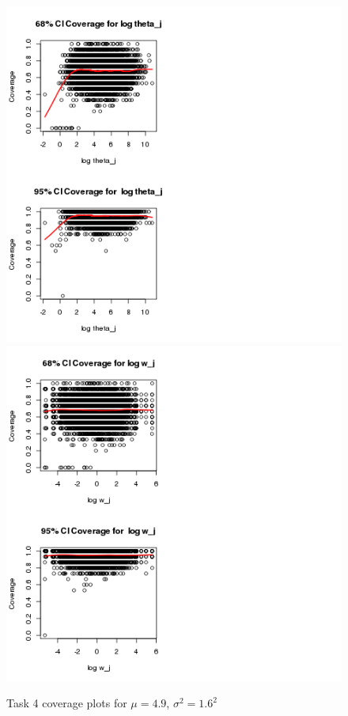 \documentclass[paper=a4, fontsize=11pt]{scrartcl}
\begin{document}
\begin{figure}[h!]
  \caption{Task 4 coverage plots for $\mu = 4.9$, $\sigma^2 = 1.6^2$}
  \centering
	\includegraphics[scale=1, trim = 80 0 150 0]{keskici_wxiao_ps2_task4_plot7.png}
		\includegraphics[scale=1, trim = 100 0 300 0]{keskici_wxiao_ps2_task4_plot8.png}
\end{figure}
\end{document}
